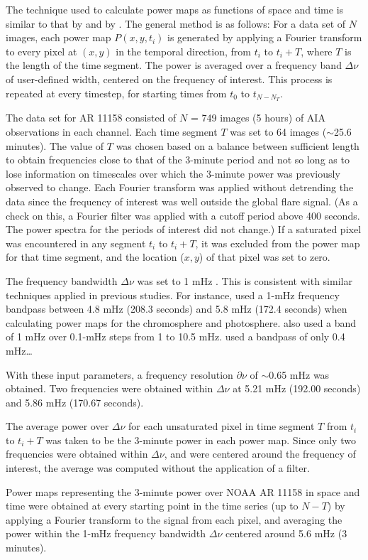The technique used to calculate power maps as functions of
space and time is similar to that  by
\cite{Jackiewicz2013} and  by \cite{Monsue2016}.
The general method is as follows:
For a data set of $N$ images, each power map
$P(x,y,t_{i})$ is generated by
applying a Fourier transform to every pixel at
$(x,y)$ in the temporal direction,
from $t_{i}$ to $t_{i}+T$, where $T$ is the length of the time segment.
The power is averaged over a frequency band $\Delta{\nu}$
of user-defined width, centered on the frequency
of interest. This process is repeated at every timestep, for starting
times from $t_{0}$ to $t_{N-N_{T}}$.

The data set for AR 11158 consisted of $N$ = 749 images (5 hours)
of AIA observations in each channel.
Each time
segment $T$ was set to 64 images ($\sim$25.6 minutes).
The value of $T$ was chosen based on
a balance between sufficient length to obtain frequencies close to
that of the 3-minute period and not so long as to lose information on
timescales over which the 3-minute power was previously observed to change.
Each Fourier transform was applied without detrending the data since
the frequency of interest was well outside the global flare signal.
(As a check on this, a Fourier filter was applied with a cutoff period
above 400 seconds. The power spectra for the periods of interest did not change.)
If a saturated pixel was encountered in any segment $t_{i}$ to $t_{i}+T$,
it was excluded from the power map for that time segment,
and the location ($x, y$) of that pixel was set to zero.

The frequency bandwidth $\Delta\nu$ was set to 1 mHz
.
This is consistent with similar techniques applied in previous studies.
For instance, \cite{Stangalini2011} used a 1-mHz frequency bandpass between 4.8 mHz
(208.3 seconds) and 5.8 mHz (172.4 seconds) when calculating power maps
 for the chromosphere and photosphere.
\cite{Tripathy2018} also used a band of 1 mHz
over 0.1-mHz steps from 1 to 10.5 mHz.
\cite{Reznikova2012} used a bandpass of only 0.4 mHz\ldots

With these input parameters,
a frequency resolution $\partial\nu$ of $\sim$0.65 mHz
was obtained.
Two frequencies were obtained within $\Delta\nu$ at
5.21 mHz (192.00 seconds) and
5.86 mHz (170.67 seconds).

The average power over $\Delta\nu$ for each unsaturated pixel in
time segment $T$ from
$t_{i}$ to $t_{i}+T$
was taken to be the 3-minute power in each power map.
Since only two frequencies were obtained within $\Delta\nu$,
and were centered around the frequency of interest,
the average was computed without the application of a filter.

Power maps representing the 3-minute power over NOAA AR 11158
in space and time
were obtained at every starting point in the time series (up to $N-T$)
by applying a Fourier transform to the signal from each pixel,
and averaging the power within the
1-mHz frequency bandwidth $\Delta\nu$ centered around 5.6 mHz (3 minutes).
